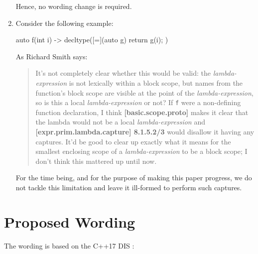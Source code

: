 \documentclass{wg21}
\newcommand{\cc}[1]{\texttt{#1}}
\begin{document}
\begin{enumerate}
    Hence, no wording change is required.

  \item \label{discussion.blockscope}
    Consider the following example:

\begin{cpp}
auto f(int i) -> decltype([=](auto g) { return g(i); }) { }
\end{cpp}

    As Richard Smith says:
    \begin{quote}
      It's not completely clear whether this would be valid: the
      \textit{lambda-expression} is not lexically within a block scope,
      but names from the function's block scope are visible at the point of
      the \textit{lambda-expression}, so is this a local \textit{lambda-expression}
      or not? If \cc{f} were a non-defining function declaration, I think
      \textbf{[basic.scope.proto]} makes it clear that the lambda would not
      be a local \textit{lambda-expression} and \textbf{[expr.prim.lambda.capture] 8.1.5.2/3}
      would disallow it having any captures. It'd be good to clear up exactly
      what it means for the smallest enclosing scope of a \textit{lambda-expression}
      to be a block scope; I don't think this mattered up until now.
    \end{quote}

    For the time being, and for the purpose of making this paper progress, we
    do not tackle this limitation and leave it ill-formed to perform such
    captures.
\end{enumerate}


\section{Proposed Wording}
The wording is based on the C++17 DIS \cite{N4659}:
\end{document}
